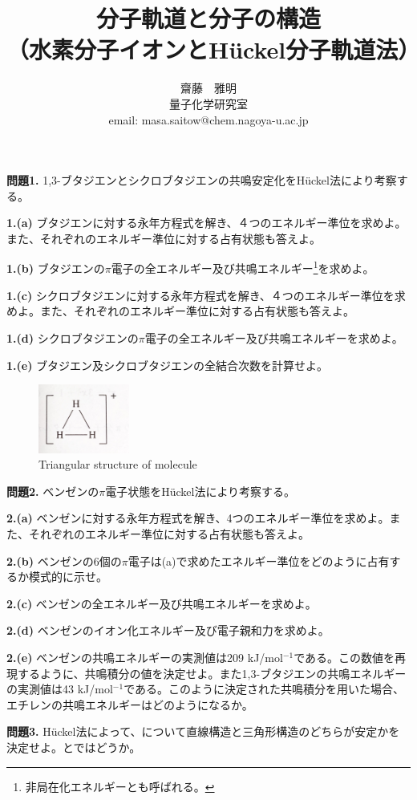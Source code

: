 \documentclass[12pt,pra,aps]{revtex4}
\begin{document}
\title{分子軌道と分子の構造 \\（水素分子イオンとH\"uckel分子軌道法）}
\author{齋藤　雅明 \\ 量子化学研究室 \\ email: masa.saitow@chem.nagoya-u.ac.jp}

\maketitle

\noindent
{\bf 問題1.} 1,3-ブタジエンとシクロブタジエンの共鳴安定化をH\"uckel法により考察する。
    
\noindent
{\bf 1.(a)} ブタジエンに対する永年方程式を解き、４つのエネルギー準位を求めよ。また、それぞれのエネルギー準位に対する占有状態も答えよ。

\noindent
{\bf 1.(b)} ブタジエンの$\pi$電子の全エネルギー及び共鳴エネルギー\footnote{非局在化エネルギーとも呼ばれる。}を求めよ。

\noindent
{\bf 1.(c)} シクロブタジエンに対する永年方程式を解き、４つのエネルギー準位を求めよ。また、それぞれのエネルギー準位に対する占有状態も答えよ。

\noindent
{\bf 1.(d)} シクロブタジエンの$\pi$電子の全エネルギー及び共鳴エネルギーを求めよ。

\noindent
{\bf 1.(e)} ブタジエン及シクロブタジエンの全結合次数を計算せよ。

\begin{figure}
  \centering
  \includegraphics[width=3.0cm]{triangle.jpg}
  \caption{Triangular structure of  molecule}
\end{figure}

\noindent
{\bf 問題2.} ベンゼンの$\pi$電子状態をH\"uckel法により考察する。

\noindent
{\bf 2.(a)} ベンゼンに対する永年方程式を解き、4つのエネルギー準位を求めよ。また、それぞれのエネルギー準位に対する占有状態も答えよ。

\noindent
{\bf 2.(b)} ベンゼンの6個の$\pi$電子は(a)で求めたエネルギー準位をどのように占有するか模式的に示せ。

\noindent
{\bf 2.(c)} ベンゼンの全エネルギー及び共鳴エネルギーを求めよ。

\noindent
{\bf 2.(d)} ベンゼンのイオン化エネルギー及び電子親和力を求めよ。

\noindent
{\bf 2.(e)} ベンゼンの共鳴エネルギーの実測値は209 kJ/mol${}^{-1}$である。この数値を再現するように、共鳴積分の値を決定せよ。また1,3-ブタジエンの共鳴エネルギーの実測値は43 kJ/mol${}^{-1}$である。このように決定された共鳴積分を用いた場合、エチレンの共鳴エネルギーはどのようになるか。

\noindent
{\bf 問題3.} H\"uckel法によって、について直線構造と三角形構造のどちらが安定かを決定せよ。とではどうか。
\end{document}
